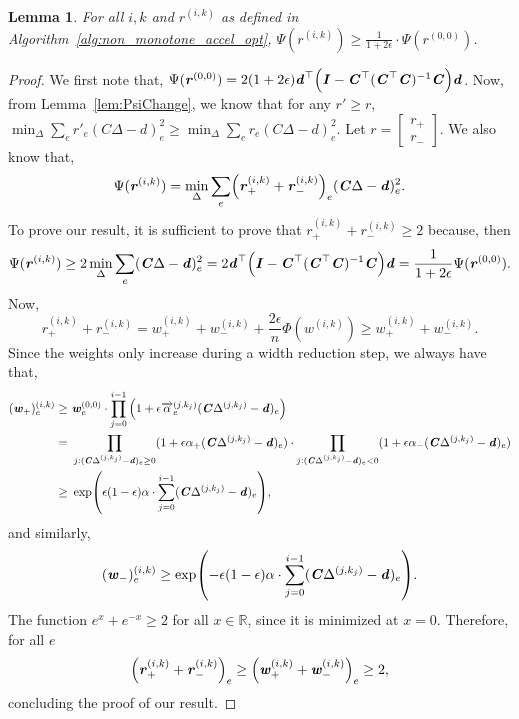 \documentclass[11pt]{article}
\newtheorem{lemma}[theorem]{Lemma}
\let\originalleft\left
\let\originalright\right
\renewcommand{\left}{\mathopen{}\mathclose\bgroup\originalleft}
\renewcommand{\right}{\aftergroup\egroup\originalright}
\newcommand\dd{\boldsymbol{\mathit{d}}}
\newcommand\rr{\boldsymbol{\mathit{r}}}
\newcommand\ww{\boldsymbol{\mathit{w}}}
\newcommand\CC{\boldsymbol{\mathit{C}}}
\newcommand\II{\boldsymbol{\mathit{I}}}
\begin{document}
\begin{lemma}\label{lem:lower_bound_Psi}
    For all $i,k$ and $\rr^{(i,k)}$ as defined in Algorithm~\ref{alg:non_monotone_accel_opt}, $\Psi(\rr^{(i,k)})\geq \frac{1}{1+2\epsilon}\cdot\Psi(\rr^{(0,0)})$.
\end{lemma}
\begin{proof}
    We first note that, $\Psi(\rr^{(0,0)}) =  2(1+2\epsilon) \dd^{\top}\left(\II - \CC^{\top}(\CC^{\top}\CC)^{-1}\CC\right)\dd$. Now, from Lemma~\ref{lem:PsiChange}, we know that for any $\rr'\geq \rr$, $\min_{\Delta}\sum_e \rr'_e (\CC\Delta-\dd)_e^2 \geq \min_{\Delta}\sum_e \rr_e (\CC\Delta-\dd)_e^2$. Let $\rr = \begin{bmatrix}
        \rr_+\\ \rr_{-}
    \end{bmatrix}$. We also know that,
    \[
    \Psi(\rr^{(i,k)}) = \min_{\Delta}\sum_e \left(\rr_+^{(i,k)} + \rr_{-}^{(i,k)}\right)_e (\CC\Delta-\dd)_e^2.
    \]
    To prove our result, it is sufficient to prove that $\rr_+^{(i,k)} + \rr_{-}^{(i,k)}\geq 2 $ because, then 
    \[
     \Psi(\rr^{(i,k)}) \geq 2 \min_{\Delta}\sum_e (\CC\Delta-\dd)_e^2 = 2 \dd^{\top}\left(\II - \CC^{\top}(\CC^{\top}\CC)^{-1}\CC\right)\dd = \frac{1}{1+2\epsilon}\Psi(\rr^{(0,0)}).    \]
     Now,
     \[
     \rr_+^{(i,k)} + \rr_{-}^{(i,k)} = \ww_+^{(i,k)} + \ww_{-}^{(i,k)} + \frac{2\epsilon}{n}\Phi(\ww^{(i,k)})\geq \ww_+^{(i,k)} + \ww_{-}^{(i,k)}.
     \]
     Since the weights only increase during a width reduction step, we always have that,
     \begin{align*}
    (\ww_+)^{(i,k)}_e \geq &~ \ww^{(0,0)}_e \cdot \prod_{j=0}^{i-1} \Big(1 + \epsilon \overrightarrow{\alpha}^{(j,k_j)}_e (\CC \Delta^{(j,k_j)} - \dd)_e\Big) \\
= &~ \prod_{j: (\CC \Delta^{(j,k_j)} - \dd)_e \geq 0} (1 + \epsilon \alpha_+ (\CC \Delta^{(j,k_j)} - \dd)_e) \cdot \prod_{j: (\CC \Delta^{(j,k_j)} - \dd)_e < 0} (1 + \epsilon \alpha_- (\CC \Delta^{(j,k_j)} - \dd)_e) \\
\geq &~ \exp\left(\epsilon(1-\epsilon)\alpha \cdot \sum_{j=0}^{i-1} (\CC \Delta^{(j,k_j)} - \dd)_e\right),
\end{align*}
and similarly,
\[
(\ww_-)^{(i,k)}_e \geq \exp\left(-\epsilon(1-\epsilon)\alpha \cdot \sum_{j=0}^{i-1} (\CC \Delta^{(j,k_j)} - \dd)_e\right).
\]
The function $e^x + e^{-x}\geq 2$ for all $x\in \mathbb{R}$, since it is minimized at $x = 0$. Therefore, for all $e$ 
\[
\left(\rr_+^{(i,k)} + \rr_{-}^{(i,k)}\right)_e \geq \left(\ww_+^{(i,k)} + \ww_{-}^{(i,k)}\right)_e \geq 2,
\]
concluding the proof of our result.
\end{proof} 

\newpage
\clearpage
\end{document}
